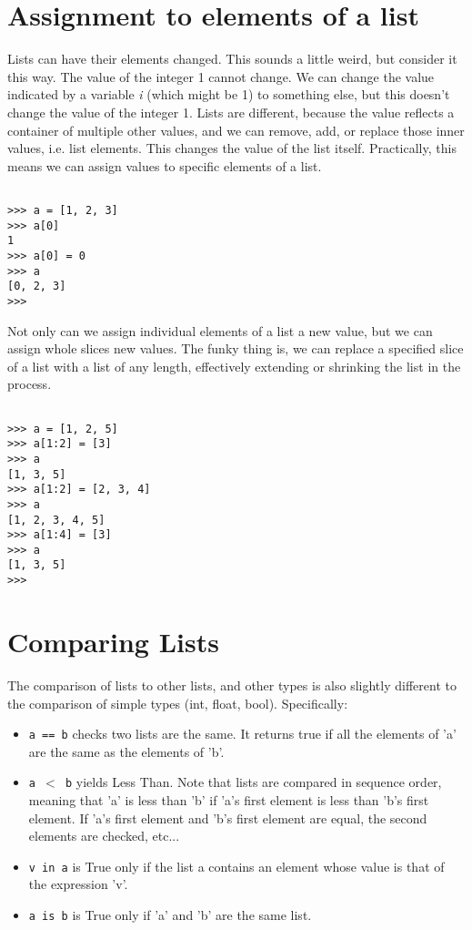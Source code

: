 \section{Assignment to elements of a list}

Lists can have their elements changed.   This sounds a little weird, but consider it this way. The value of the   integer 1 cannot change. We can change the value indicated by a   variable \textit{i} (which might be 1) to something else, but this doesn't   change the value of the integer 1. Lists are different, because the   value reflects a container of multiple other values, and we can remove,   add, or replace those inner values, i.e. list elements. This changes   the value of the list itself. Practically, this means we can assign   values to specific elements of a list.


\begin{lstlisting}

>>> a = [1, 2, 3]
>>> a[0]
1
>>> a[0] = 0
>>> a
[0, 2, 3]
>>> 
\end{lstlisting}

Not only can we assign individual elements of a list a new value,   but we can assign whole slices new values. The funky thing is, we can   replace a specified slice of a list with a list of any length,   effectively extending or shrinking the list in the process.


\begin{lstlisting}

>>> a = [1, 2, 5]
>>> a[1:2] = [3]
>>> a
[1, 3, 5]
>>> a[1:2] = [2, 3, 4]
>>> a
[1, 2, 3, 4, 5]
>>> a[1:4] = [3]
>>> a
[1, 3, 5]
>>> 
\end{lstlisting}

\section{Comparing Lists}

The comparison of lists to other lists, and other types is also   slightly different to the comparison of simple types (int, float,   bool). Specifically:
\begin{itemize}
	\item 
\texttt{a == b} checks two lists are the same. It returns true if all the elements of 'a' are the same as the elements of 'b'.
	\item 
\texttt{a $<$ b} yields Less Than. Note that lists are    compared in sequence order, meaning that 'a' is less than 'b' if    'a's first element is less than 'b's first element. If 'a's first    element and 'b's first element are equal, the second elements are    checked, etc...
	\item 
\texttt{v in a} is True only if the list a contains an    element whose value is that of the expression 'v'.
	\item 
\texttt{a is b} is True only if 'a' and 'b' are the same    list.
\end{itemize}

